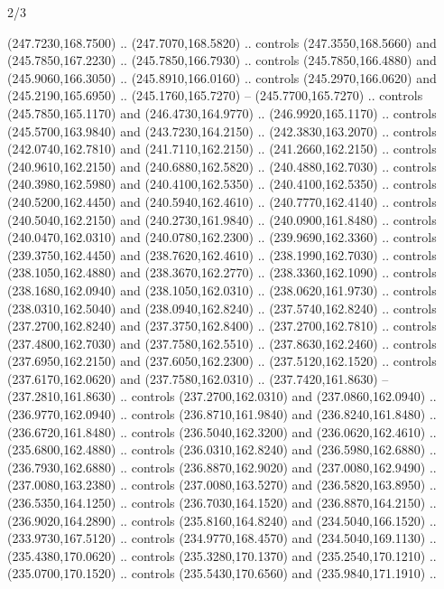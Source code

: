 \begin{flagdescription}{2/3}
\begin{scope}[xshift=0.5\flaglength,yshift=0.5\flagwidth,scale=\flagwidth/259.2]
\begin{scope}[y=0.8pt, x=0.8pt, yscale=-1,shift={(-243,-162)}]
      (247.7230,168.7500) .. (247.7070,168.5820) .. controls (247.3550,168.5660) and
      (245.7850,167.2230) .. (245.7850,166.7930) .. controls (245.7850,166.4880) and
      (245.9060,166.3050) .. (245.8910,166.0160) .. controls (245.2970,166.0620) and
      (245.2190,165.6950) .. (245.1760,165.7270) -- (245.7700,165.7270) .. controls
      (245.7850,165.1170) and (246.4730,164.9770) .. (246.9920,165.1170) .. controls
      (245.5700,163.9840) and (243.7230,164.2150) .. (242.3830,163.2070) .. controls
      (242.0740,162.7810) and (241.7110,162.2150) .. (241.2660,162.2150) .. controls
      (240.9610,162.2150) and (240.6880,162.5820) .. (240.4880,162.7030) .. controls
      (240.3980,162.5980) and (240.4100,162.5350) .. (240.4100,162.5350) .. controls
      (240.5200,162.4450) and (240.5940,162.4610) .. (240.7770,162.4140) .. controls
      (240.5040,162.2150) and (240.2730,161.9840) .. (240.0900,161.8480) .. controls
      (240.0470,162.0310) and (240.0780,162.2300) .. (239.9690,162.3360) .. controls
      (239.3750,162.4450) and (238.7620,162.4610) .. (238.1990,162.7030) .. controls
      (238.1050,162.4880) and (238.3670,162.2770) .. (238.3360,162.1090) .. controls
      (238.1680,162.0940) and (238.1050,162.0310) .. (238.0620,161.9730) .. controls
      (238.0310,162.5040) and (238.0940,162.8240) .. (237.5740,162.8240) .. controls
      (237.2700,162.8240) and (237.3750,162.8400) .. (237.2700,162.7810) .. controls
      (237.4800,162.7030) and (237.7580,162.5510) .. (237.8630,162.2460) .. controls
      (237.6950,162.2150) and (237.6050,162.2300) .. (237.5120,162.1520) .. controls
      (237.6170,162.0620) and (237.7580,162.0310) .. (237.7420,161.8630) --
      (237.2810,161.8630) .. controls (237.2700,162.0310) and (237.0860,162.0940) ..
      (236.9770,162.0940) .. controls (236.8710,161.9840) and (236.8240,161.8480) ..
      (236.6720,161.8480) .. controls (236.5040,162.3200) and (236.0620,162.4610) ..
      (235.6800,162.4880) .. controls (236.0310,162.8240) and (236.5980,162.6880) ..
      (236.7930,162.6880) .. controls (236.8870,162.9020) and (237.0080,162.9490) ..
      (237.0080,163.2380) .. controls (237.0080,163.5270) and (236.5820,163.8950) ..
      (236.5350,164.1250) .. controls (236.7030,164.1520) and (236.8870,164.2150) ..
      (236.9020,164.2890) .. controls (235.8160,164.8240) and (234.5040,166.1520) ..
      (233.9730,167.5120) .. controls (234.9770,168.4570) and (234.5040,169.1130) ..
      (235.4380,170.0620) .. controls (235.3280,170.1370) and (235.2540,170.1210) ..
      (235.0700,170.1520) .. controls (235.5430,170.6560) and (235.9840,171.1910) ..

\end{scope}
\end{scope}
\end{flagdescription}
